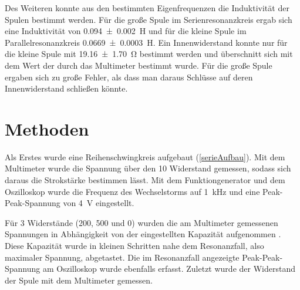 \documentclass[
	a4paper,
	12pt,
	pagesize,
	ngerman
]{scrartcl}
\begin{document}
	Des Weiteren konnte aus den bestimmten Eigenfrequenzen die Induktivität der Spulen bestimmt werden.
	Für die große Spule im Serienresonanzkreis ergab sich eine Induktivität von \SI{0,094 \pm 0,002}{H} und für die kleine Spule im Parallelresonanzkreis \SI{0,0669 \pm 0,0003}{H}.
	Ein Innenwiderstand konnte nur für die kleine Spule mit \SI{19.16\pm1,70}{\ohm} bestimmt werden und überschnitt sich mit dem Wert der durch das Multimeter bestimmt wurde.
	Für die große Spule ergaben sich zu große Fehler, als dass man daraus Schlüsse auf deren Innenwiderstand schließen könnte.



	\section{Methoden}
	Als Erstes wurde eine Reihenschwingkreis aufgebaut (\cref{serieAufbau}).
	Mit dem Multimeter wurde die Spannung über den \SI{10}{\Omega} Widerstand gemessen, sodass sich daraus die Strokstärke bestimmen lässt.
	Mit dem Funktiongenerator und dem Oszilloskop wurde die Frequenz des Wechselstorms auf \SI{1}{kHz} und eine Peak-Peak-Spannung von \SI{4}{V} eingestellt.

	Für 3 Widerstände (\SI{200}{\Omega}, \SI{500}{\Omega} und \SI{0}{\Omega}) wurden die am Multimeter gemessenen Spannungen in Abhängigkeit von der eingestellten Kapazität aufgenommen .
	Diese Kapazität wurde in kleinen Schritten nahe dem Resonanzfall, also maximaler Spannung, abgetastet.
	Die im Resonanzfall angezeigte Peak-Peak-Spannung am Oszilloskop wurde ebenfalls erfasst.
	Zuletzt wurde der Widerstand der Spule mit dem Multimeter gemessen.
\end{document}
